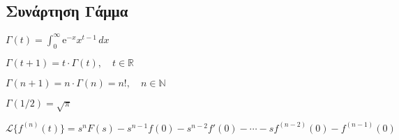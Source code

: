 \documentclass[a4paper]{report}
\begin{document}
{  \subsection*{Συνάρτηση Γάμμα}
  \begin{myitemize}
    \item $ \Gamma (t) = \int _{0}^{\infty} \mathrm{e}^{-x} x^{t-1} \,{dx} $
    \item $\Gamma (t+1) = t \cdot \Gamma (t), \quad t \in \mathbb{R} $
    \item $\Gamma (n+1) = n \cdot \Gamma (n) = n!, \quad n \in \mathbb{N}$
    \item $\Gamma \left({1}/{2}\right) = \sqrt{\pi}$
  \end{myitemize}
}
\begin{myitemize}
  \item $ \mathcal{L}\{f^{(n)}(t)\} = s^{n} F(s) - s^{n-1}f(0) - s^{n-2}f'(0) - 
    \cdots - sf^{(n-2)}(0)- f^{(n-1)}(0) $
\end{myitemize}

\end{document}
